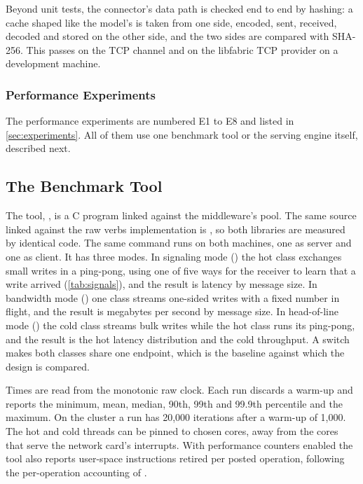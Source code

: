 Beyond unit tests, the connector's data path is checked end to end by hashing:
a cache shaped like the model's is taken from one side, encoded, sent, received,
decoded and stored on the other side, and the two sides are compared with
SHA-256. This passes on the TCP channel and on the libfabric TCP provider on a
development machine. 

\subsubsection{Performance Experiments}

The performance experiments are numbered E1 to E8 and listed in
\cref{sec:experiments}. All of them use one benchmark tool or the serving
engine itself, described next.

\subsection{The Benchmark Tool}
\label{sec:sfbench}

The tool, , is a C program linked against the middleware's
pool. The same source linked against the raw verbs implementation is
, so both libraries are measured by identical code. The same
command runs on both machines, one as server and one as client. It has three
modes. In signaling mode () the hot class exchanges small writes in
a ping-pong, using one of five ways for the receiver to learn that a write
arrived (\cref{tab:signals}), and the result is latency by message size. In
bandwidth mode () one class streams one-sided writes with a fixed
number in flight, and the result is megabytes per second by message size. In
head-of-line mode () the cold class streams bulk writes while the
hot class runs its ping-pong, and the result is the hot latency distribution
and the cold throughput. A switch makes both classes share one endpoint,
which is the baseline against which the design is compared.

Times are read from the monotonic raw clock. Each run discards a warm-up and
reports the minimum, mean, median, 90th, 99th and 99.9th percentile and the
maximum. On the cluster a run has 20,000 iterations after a warm-up of 1,000.
The hot and cold threads can be pinned to chosen cores, away from the cores
that serve the network card's interrupts. With performance counters enabled
the tool also reports user-space instructions retired per posted operation,
following the per-operation accounting of \citet{papadopoulou2017ucx}.


